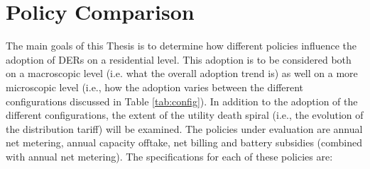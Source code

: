 \section{Policy Comparison}
\label{compar}
The main goals of this Thesis is to determine how different policies influence the adoption of DERs on a residential level. This adoption is to be considered both on a macroscopic level (i.e. what the overall adoption trend is) as well on a more microscopic level (i.e., how the adoption varies between the different configurations discussed in Table \ref{tab:config}). In addition to the adoption of the different configurations, the extent of the utility death spiral (i.e., the evolution of the distribution tariff) will be examined. The policies under evaluation are annual net metering, annual capacity offtake, net billing and battery subsidies (combined with annual net metering). The specifications for each of these policies are:
